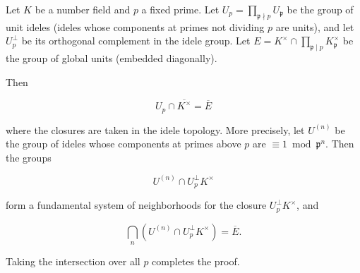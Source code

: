 Let $K$ be a number field and $p$ a fixed prime. Let $U_p = \prod_{\mathfrak{p} \nmid p} U_\mathfrak{p}$ be the group of unit ideles (ideles whose components at primes not dividing $p$ are units), and let $U_p^\perp$ be its orthogonal complement in the idele group. Let $E = K^\times \cap \prod_{\mathfrak{p}\mid p} K_\mathfrak{p}^\times$ be the group of global units (embedded diagonally).

Then

$$
U_p \cap \overline{K^\times} = \overline{E}
$$

where the closures are taken in the idele topology. More precisely, let $U^{(n)}$ be the group of ideles whose components at primes above $p$ are $\equiv 1 \bmod \mathfrak{p}^n$. Then the groups

$$
U^{(n)} \cap U_p^\perp K^\times
$$

form a fundamental system of neighborhoods for the closure $U_p^\perp K^\times$, and

$$
\bigcap_n \left(U^{(n)} \cap U_p^\perp K^\times\right) = \overline{E}.
$$

Taking the intersection over all $p$ completes the proof.
